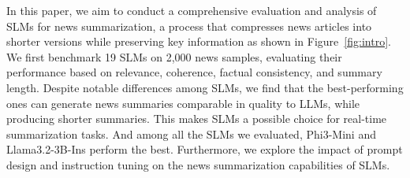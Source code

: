 

In this paper, we aim to conduct a comprehensive evaluation and analysis of SLMs for news summarization, a process that compresses news articles into shorter versions while preserving key information as shown in Figure~\ref{fig:intro}. We first benchmark 19 SLMs on 2,000 news samples, evaluating their performance based on relevance, coherence, factual consistency, and summary length. Despite notable differences among SLMs, we find that the best-performing ones can generate news summaries comparable in quality to LLMs, while producing shorter summaries. This makes SLMs a possible choice for real-time summarization tasks. And among all the SLMs we evaluated, Phi3-Mini and Llama3.2-3B-Ins perform the best. Furthermore, we explore the impact of prompt design and instruction tuning on the news summarization capabilities of SLMs.



